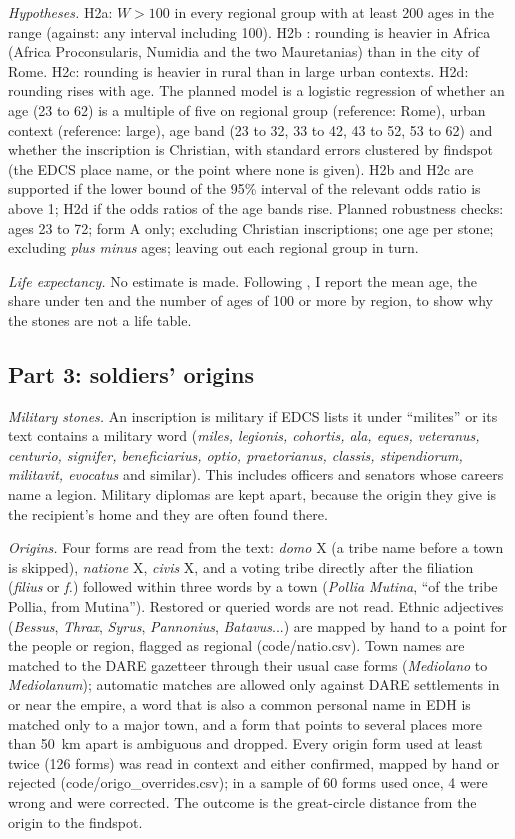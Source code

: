 \documentclass[11pt,a4paper]{article}
\begin{document}
\textit{Hypotheses.} H2a: $W > 100$ in every regional group with at least 200 ages in the range (against: any interval including 100). H2b \citep{duncanjones1977}: rounding is heavier in Africa (Africa Proconsularis, Numidia and the two Mauretanias) than in the city of Rome. H2c: rounding is heavier in rural than in large urban contexts. H2d: rounding rises with age. The planned model is a logistic regression of whether an age (23 to 62) is a multiple of five on regional group (reference: Rome), urban context (reference: large), age band (23 to 32, 33 to 42, 43 to 52, 53 to 62) and whether the inscription is Christian, with standard errors clustered by findspot (the EDCS place name, or the point where none is given). H2b and H2c are supported if the lower bound of the 95\% interval of the relevant odds ratio is above 1; H2d if the odds ratios of the age bands rise. Planned robustness checks: ages 23 to 72; form A only; excluding Christian inscriptions; one age per stone; excluding \textit{plus minus} ages; leaving out each regional group in turn.

\textit{Life expectancy.} No estimate is made. Following \citet{hopkins1966}, I report the mean age, the share under ten and the number of ages of 100 or more by region, to show why the stones are not a life table.

\subsection{Part 3: soldiers' origins}
\textit{Military stones.} An inscription is military if EDCS lists it under ``milites'' or its text contains a military word (\textit{miles, legionis, cohortis, ala, eques, veteranus, centurio, signifer, beneficiarius, optio, praetorianus, classis, stipendiorum, militavit, evocatus} and similar). This includes officers and senators whose careers name a legion. Military diplomas are kept apart, because the origin they give is the recipient's home and they are often found there.

\textit{Origins.} Four forms are read from the text: \textit{domo} X (a tribe name before a town is skipped), \textit{natione} X, \textit{civis} X, and a voting tribe directly after the filiation (\textit{filius} or \textit{f.}) followed within three words by a town (\textit{Pollia Mutina}, ``of the tribe Pollia, from Mutina''). Restored or queried words are not read. Ethnic adjectives (\textit{Bessus}, \textit{Thrax}, \textit{Syrus}, \textit{Pannonius}, \textit{Batavus}...) are mapped by hand to a point for the people or region, flagged as regional (code/natio.csv). Town names are matched to the DARE gazetteer through their usual case forms (\textit{Mediolano} to \textit{Mediolanum}); automatic matches are allowed only against DARE settlements in or near the empire, a word that is also a common personal name in EDH is matched only to a major town, and a form that points to several places more than 50~km apart is ambiguous and dropped. Every origin form used at least twice (126 forms) was read in context and either confirmed, mapped by hand or rejected (code/origo\_overrides.csv); in a sample of 60 forms used once, 4 were wrong and were corrected. The outcome is the great-circle distance from the origin to the findspot.
\end{document}
